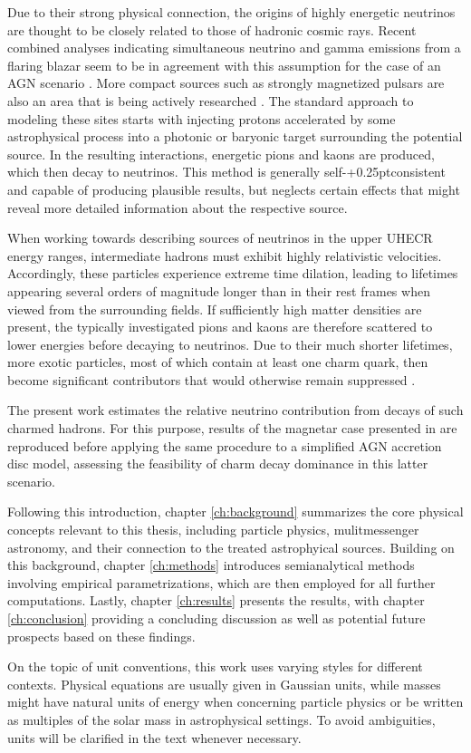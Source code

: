 Due to their strong physical connection, the origins of highly energetic neutrinos are thought to be closely related
to those of hadronic cosmic rays. Recent combined analyses indicating simultaneous neutrino and gamma emissions from a
flaring blazar seem to be in agreement with this assumption for the case of an AGN scenario \cite{ic_blazar_flare, ic_blazar_signal}.
More compact sources such as strongly magnetized pulsars are also an area that is being actively researched \cite{Murase_2009}.
The standard approach to modeling these sites starts with injecting protons accelerated by some astrophysical process into
a photonic or baryonic target surrounding the potential source. In the resulting interactions, energetic pions and kaons are
produced, which then decay to neutrinos. This method is generally self-{\kern+0.25pt}consistent and capable of producing
plausible results, but neglects certain effects that might reveal more detailed information about the respective source.

When working towards describing sources of neutrinos in the upper UHECR energy ranges, intermediate hadrons must exhibit
highly relativistic velocities. Accordingly, these particles experience extreme time dilation, leading to lifetimes
appearing several orders of magnitude longer than in their rest frames when viewed from the surrounding fields.
If sufficiently high matter densities are present, the typically investigated pions and kaons are therefore scattered
to lower energies before decaying to neutrinos. Due to their much shorter lifetimes, more exotic particles, most of which
contain at least one charm quark, then become significant contributors that would otherwise remain suppressed \cite{Tjus_2023}.

The present work estimates the relative neutrino contribution from decays of such charmed hadrons. For this purpose, results
of the magnetar case presented in \cite{Carpio_2020} are reproduced before applying the same procedure to a simplified AGN
accretion disc model, assessing the feasibility of charm decay dominance in this latter scenario.

Following this introduction, chapter \ref{ch:background} summarizes the core physical concepts relevant to this thesis,
including particle physics, mulitmessenger astronomy, and their connection to the treated astrophyical sources. Building
on this background, chapter \ref{ch:methods} introduces semianalytical methods involving empirical parametrizations,
which are then employed for all further computations. Lastly, chapter \ref{ch:results} presents the results, with chapter
\ref{ch:conclusion} providing a concluding discussion as well as potential future prospects based on these findings.

On the topic of unit conventions, this work uses varying styles for different contexts. Physical equations are usually given
in Gaussian units, while masses might have natural units of energy when concerning particle physics or be written as multiples
of the solar mass in astrophysical settings. To avoid ambiguities, units will be clarified in the text whenever necessary.
